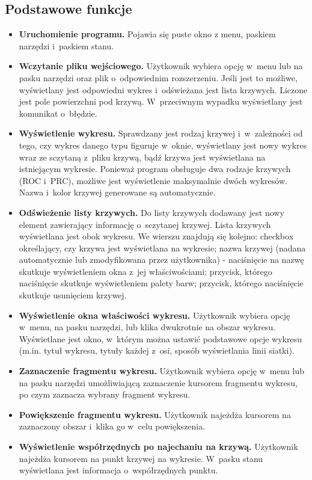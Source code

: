 \documentclass[12pt,a4paper,titlepage]{article}
\begin{document}
\subsection{Podstawowe funkcje}
\begin{itemize}
\item \textbf{Uruchomienie programu.} Pojawia się puste okno z menu, paskiem narzędzi i~paskiem stanu.
\item \textbf{Wczytanie pliku wejściowego.} Użytkownik wybiera opcję w~menu lub na pasku narzędzi oraz plik o~odpowiednim rozszerzeniu. Jeśli jest to możliwe, wyświetlany jest odpowiedni wykres i~odświeżana jest lista krzywych. Liczone jest pole powierzchni pod krzywą. W~przeciwnym wypadku wyświetlany jest komunikat o~błędzie.
\item \textbf{Wyświetlenie wykresu.} Sprawdzany jest rodzaj krzywej i~w~zależności od tego, czy wykres danego typu figuruje w~oknie, wyświetlany jest nowy wykres wraz ze sczytaną z~pliku krzywą, bądź krzywa jest wyświetlana na istniejącym wykresie. Ponieważ program obsługuje dwa rodzaje krzywych (ROC i~PRC), możliwe jest wyświetlenie maksymalnie dwóch wykresów. Nazwa i~kolor krzywej generowane są automatycznie.
\item \textbf{Odświeżenie listy krzywych.} Do listy krzywych dodawany jest nowy element zawierający informację o~sczytanej krzywej. Lista krzywych wyświetlana jest obok wykresu. We wierszu znajdują się kolejno: checkbox określający, czy krzywa jest wyświetlana na wykresie; nazwa krzywej (nadana automatycznie lub zmodyfikowana przez użytkownika) - naciśnięcie na nazwę skutkuje wyświetleniem okna z~jej właściwościami; przycisk, którego naciśnięcie skutkuje wyświetleniem palety barw; przycisk, którego naciśnięcie skutkuje usunięciem krzywej.
\item \textbf{Wyświetlenie okna właściwości wykresu.} Użytkownik wybiera opcję w~menu, na pasku narzędzi, lub klika dwukrotnie na obszar wykresu. Wyświetlane jest okno, w~którym można ustawić podstawowe opcje wykresu (m.in. tytuł wykresu, tytuły każdej z~osi, sposób wyświetlania linii siatki).
\item \textbf{Zaznaczenie fragmentu wykresu.} Użytkownik wybiera opcję w~menu lub na pasku narzędzi umożliwiającą zaznaczenie kursorem fragmentu wykresu, po czym zaznacza wybrany fragment wykresu.
\item \textbf{Powiększenie fragmentu wykresu.} Użytkownik najeżdża kursorem na zaznaczony obszar i~klika go w~celu powiększenia.
\item \textbf{Wyświetlenie współrzędnych po najechaniu na krzywą.} Użytkownik najeżdża kursorem na punkt krzywej na wykresie. W~pasku stanu wyświetlana jest informacja o~współrzędnych punktu.

\end{itemize}
\end{document}
